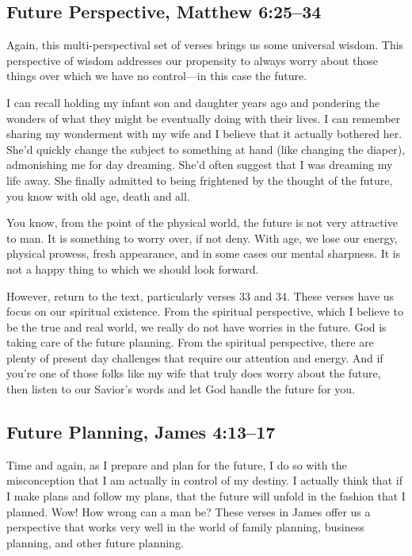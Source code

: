 \documentclass[12pt]{memoir}
\begin{document}
\subsection[Future Perspective]{Future Perspective, Matthew 6:25--34}

Again, this multi-perspectival set of verses brings us some universal wisdom. This perspective of wisdom addresses our propensity to always worry about those things over which we have no control---in this case the future.

I can recall holding my infant son and daughter years ago and pondering the wonders of what they might be eventually doing with their lives.
I can remember sharing my wonderment with my wife and I believe that it actually bothered her. She'd quickly change the subject to something at hand (like changing the diaper), admonishing me for day
dreaming. She'd often suggest that I was dreaming my life away. She
finally admitted to being frightened by the thought of the future,
you know with old age, death and all.

You know, from the point of the physical world, the future is not
very attractive to man. It is something to worry over, if not deny.
With age, we lose our energy, physical prowess, fresh appearance,
and in some cases our mental sharpness. It is not a happy thing
to which we should look forward.

However, return to the text, particularly verses 33 and 34. These verses have us focus on our spiritual
existence. From the spiritual perspective, which I believe to be the
true and real world, we really do not have worries in the future.
God is taking care of the future planning. From the spiritual
perspective, there are plenty of present day challenges that
require our attention and energy. And if you're one of those folks
like my wife that truly does worry about the future, then listen to
our Savior's words and let God handle the future for you.

\subsection[Future Planning]{Future Planning, James 4:13--17}

Time and again, as I prepare and plan for the future, I do so with the misconception that I am actually in control of my destiny. I actually think that if I make plans and follow my plans, that the future will unfold in the fashion that I planned. Wow! How wrong can a man be? These verses in James offer us a perspective that works very well in the world of family planning, business planning, and other future planning.
\end{document}
